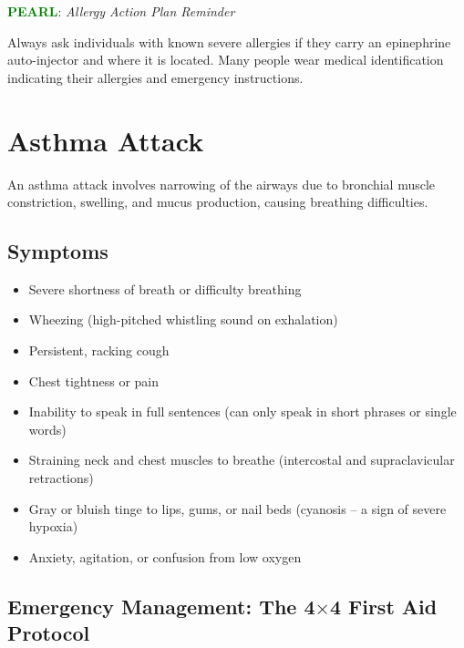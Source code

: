 \noindent\textbf{\textcolor{green}{PEARL}}: \textit{Allergy Action Plan Reminder}

Always ask individuals with known severe allergies if they carry an epinephrine auto-injector and where it is located. Many people wear medical identification indicating their allergies and emergency instructions.

\section{Asthma Attack}

An asthma attack involves narrowing of the airways due to bronchial muscle constriction, swelling, and mucus production, causing breathing difficulties.

\subsection{Symptoms}

\begin{itemize}[leftmargin=*]
  \item Severe shortness of breath or difficulty breathing
  \item Wheezing (high-pitched whistling sound on exhalation)
  \item Persistent, racking cough
  \item Chest tightness or pain
  \item Inability to speak in full sentences (can only speak in short phrases or single words)
  \item Straining neck and chest muscles to breathe (intercostal and supraclavicular retractions)
  \item Gray or bluish tinge to lips, gums, or nail beds (cyanosis -- a sign of severe hypoxia)
  \item Anxiety, agitation, or confusion from low oxygen
\end{itemize}

\subsection{Emergency Management: The 4$\times$4 First Aid Protocol}

